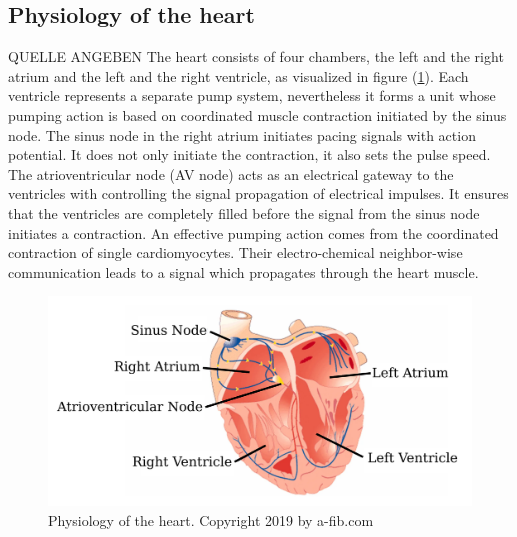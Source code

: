 \subsection{Physiology of the heart}
QUELLE ANGEBEN
The heart consists of four chambers, the left and the right
atrium and the left and the right ventricle, as visualized in figure (\ref{fig:heart_anatomy}). Each ventricle represents a separate pump system, nevertheless it forms a unit whose pumping action is based on coordinated muscle contraction initiated by the sinus node. The sinus node in the right atrium initiates pacing signals with action potential. It does not only initiate the contraction, it also sets the pulse speed. The atrioventricular node (AV node) acts as an electrical gateway to the ventricles with controlling the signal propagation of electrical impulses. It ensures that the ventricles are completely filled before the signal from the sinus node initiates a contraction. An effective pumping action comes from the coordinated contraction of single cardiomyocytes. Their electro-chemical neighbor-wise communication leads to a signal which propagates through the heart muscle.

\begin{figure}[ht]
    \center
    \includegraphics[width=1.0\textwidth]{figures/heart_physiology.png}
	\caption{Physiology of the heart. Copyright 2019 by a-fib.com}
	\label{fig:heart_anatomy}
\end{figure}


